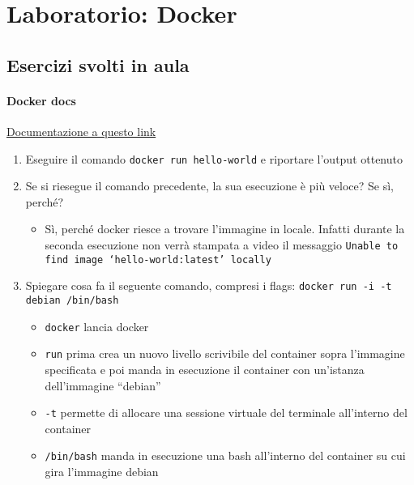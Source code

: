 \newpage
\section{Laboratorio: Docker}

\subsection{Esercizi svolti in aula}
\paragraph{Docker docs} \href{https://docs.docker.com/engine/reference/commandline/run/}{Documentazione a questo link}
\begin{enumerate}
    \item Eseguire il comando \verb|docker run hello-world| e riportare l’output ottenuto
    \item Se si riesegue il comando precedente, la sua esecuzione è più veloce? Se sì, perché?
    \begin{itemize}
        \item Sì, perché docker riesce a trovare l’immagine in locale. Infatti durante la seconda esecuzione non verrà stampata a video il messaggio \verb|Unable to find image ‘hello-world:latest’ locally|
    \end{itemize}
    \item Spiegare cosa fa il seguente comando, compresi i flags: \verb|docker run -i -t debian /bin/bash|
    \begin{itemize}
        \item \verb|docker| lancia docker
        \item \verb|run| prima crea un nuovo livello scrivibile del container sopra l’immagine specificata e poi manda in esecuzione il container con un’istanza dell’immagine “debian”
        \item \verb|-t| permette di allocare una sessione virtuale del terminale all’interno del container 
        \item \verb|/bin/bash| manda in esecuzione una bash all’interno del container su cui gira l’immagine debian
    \end{itemize}


\end{enumerate}
